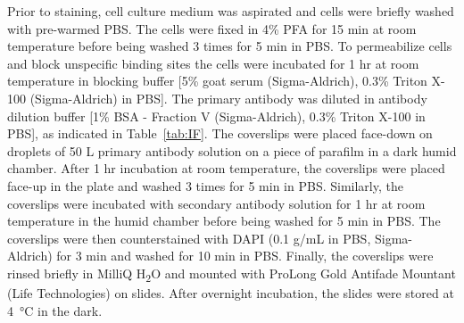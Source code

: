 \normalfont Prior to staining, cell culture medium was aspirated and cells were briefly washed with pre-warmed PBS. The cells were fixed in 4\% PFA for 15 min at room temperature before being washed 3 times for 5 min in PBS. To permeabilize cells and block unspecific binding sites the cells were incubated for 1 hr at room temperature in blocking buffer [5\% goat serum (Sigma-Aldrich), 0.3\% Triton X-100 (Sigma-Aldrich) in PBS]. The primary antibody was diluted in antibody dilution buffer [1\% BSA - Fraction V (Sigma-Aldrich), 0.3\% Triton X-100 in PBS], as indicated in Table~\ref{tab:IF}. The coverslips were placed face-down on droplets of 50 {}\textmu L primary antibody solution on a piece of parafilm in a dark humid chamber. After 1 hr incubation at room temperature, the coverslips were placed face-up in the plate and washed 3 times for 5 min in PBS. Similarly, the coverslips were incubated with secondary antibody solution for 1 hr at room temperature in the humid chamber before being washed for 5 min in PBS. The coverslips were then counterstained with DAPI (0.1 {}\textmu g/mL in PBS, Sigma-Aldrich) for 3 min and washed for 10 min in PBS. Finally, the coverslips were rinsed briefly in MilliQ H\textsubscript{2}O and mounted with ProLong Gold Antifade Mountant (Life Technologies) on slides. After overnight incubation, the slides were stored at \SI{4}{\celsius} in the dark.

